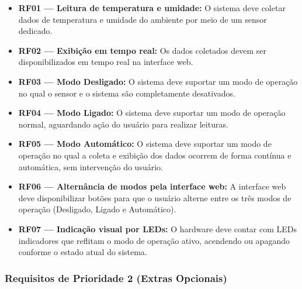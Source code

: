 \begin{itemize}
    \item \textbf{RF01 — Leitura de temperatura e umidade:} O sistema deve coletar
    dados de temperatura e umidade do ambiente por meio de um sensor dedicado.

    \item \textbf{RF02 — Exibição em tempo real:} Os dados coletados devem ser
    disponibilizados em tempo real na interface web.

    \item \textbf{RF03 — Modo Desligado:} O sistema deve suportar um modo de operação
    no qual o sensor e o sistema são completamente desativados.

    \item \textbf{RF04 — Modo Ligado:} O sistema deve suportar um modo de operação
    normal, aguardando ação do usuário para realizar leituras.

    \item \textbf{RF05 — Modo Automático:} O sistema deve suportar um modo de operação
    no qual a coleta e exibição dos dados ocorrem de forma contínua e automática, sem
    intervenção do usuário.

    \item \textbf{RF06 — Alternância de modos pela interface web:} A interface web deve
    disponibilizar botões para que o usuário alterne entre os três modos de operação
    (Desligado, Ligado e Automático).

    \item \textbf{RF07 — Indicação visual por LEDs:} O hardware deve contar com LEDs
    indicadores que reflitam o modo de operação ativo, acendendo ou apagando conforme
    o estado atual do sistema.
\end{itemize}

\subsubsection{Requisitos de Prioridade 2 (Extras Opcionais)}

